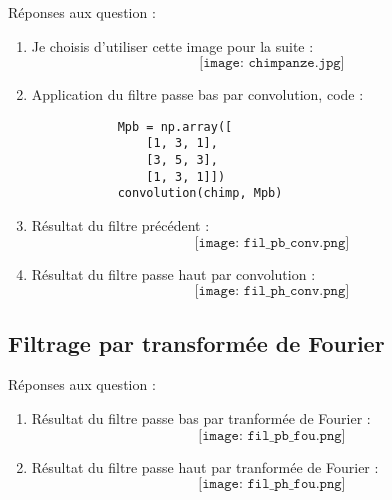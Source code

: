 \documentclass[12pt]{article}
\begin{document}
Réponses aux question :
\begin{enumerate}
	
	\item 
		Je choisis d'utiliser cette image pour la suite : 
		$$
			\texttt{[image: chimpanze.jpg]}
		$$
	
	\item 
		Application du filtre passe bas par convolution, code : 
		\begin{verbatim}
			Mpb = np.array([
				[1, 3, 1],
				[3, 5, 3],
				[1, 3, 1]])
			convolution(chimp, Mpb)
		\end{verbatim}
	\item
		Résultat du filtre précédent : 
		$$
			\texttt{[image: fil\_pb\_conv.png]}
		$$
	\item
		Résultat du filtre passe haut par convolution : 
		$$
			\texttt{[image: fil\_ph\_conv.png]}
		$$
		
\end{enumerate}

\subsection{Filtrage par transformée de Fourier}

Réponses aux question :
\begin{enumerate}
	
	\item
		Résultat du filtre passe bas par tranformée de Fourier : 
		$$
			\texttt{[image: fil\_pb\_fou.png]}
		$$
	\item
		Résultat du filtre passe haut par tranformée de Fourier : 
		$$
			\texttt{[image: fil\_ph\_fou.png]}
		$$
		
\end{enumerate}
\end{document}
